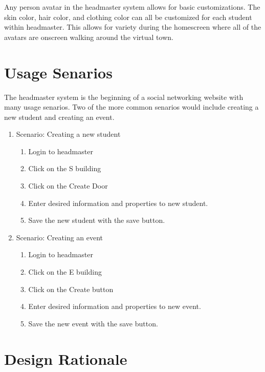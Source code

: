 \documentclass[11pt]{article}
\begin{document}
Any person avatar in the headmaster system allows for basic customizations. The skin color, hair color, and clothing color can all be customized for each student within headmaster. This allows for variety during the homescreen where all of the avatars are onscreen walking around the virtual town.

\section{Usage Senarios}
The headmaster system is the beginning of a social networking website with many usage senarios. Two of the more common senarios would include creating a new student and creating an event.
\begin{enumerate}
    \item Scenario: Creating a new student
  \begin{enumerate}
        \item Login to headmaster
        \item Click on the S building
        \item Click on the Create Door
        \item Enter desired information and properties to new student.
        \item Save the new student with the save button.
  \end{enumerate}
    \item Scenario: Creating an event
  \begin{enumerate}
        \item Login to headmaster
        \item Click on the E building
        \item Click on the Create button
        \item Enter desired information and properties to new event.
        \item Save the new event with the save button.
  \end{enumerate}
\end{enumerate}

\section{Design Rationale}
\end{document}
